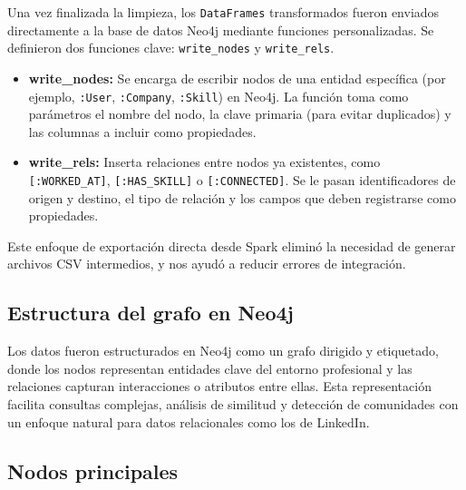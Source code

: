 \documentclass[10pt]{article}
\begin{document}
Una vez finalizada la limpieza, los \texttt{DataFrames} transformados fueron enviados directamente a la base de datos Neo4j mediante funciones personalizadas. Se definieron dos funciones clave: \texttt{write\_nodes} y \texttt{write\_rels}.

\begin{itemize}
	\item \textbf{write\_nodes:}
	      Se encarga de escribir nodos de una entidad específica (por ejemplo, \texttt{:User}, \texttt{:Company}, \texttt{:Skill}) en Neo4j. La función toma como parámetros el nombre del nodo, la clave primaria (para evitar duplicados) y las columnas a incluir como propiedades. 
	      
	\item \textbf{write\_rels:}
	      Inserta relaciones entre nodos ya existentes, como \texttt{[:WORKED\_AT]}, \texttt{[:HAS\_SKILL]} o \texttt{[:CONNECTED]}. Se le pasan identificadores de origen y destino, el tipo de relación y los campos que deben registrarse como propiedades. 
\end{itemize}

Este enfoque de exportación directa desde Spark eliminó la necesidad de generar archivos CSV intermedios, y nos ayudó a reducir errores de integración.

\subsection{Estructura del grafo en Neo4j}
Los datos fueron estructurados en Neo4j como un grafo dirigido y etiquetado, donde los nodos representan entidades clave del entorno profesional y las relaciones capturan interacciones o atributos entre ellas. Esta representación facilita consultas complejas, análisis de similitud y detección de comunidades con un enfoque natural para datos relacionales como los de LinkedIn.

\subsection*{Nodos principales}
\end{document}
